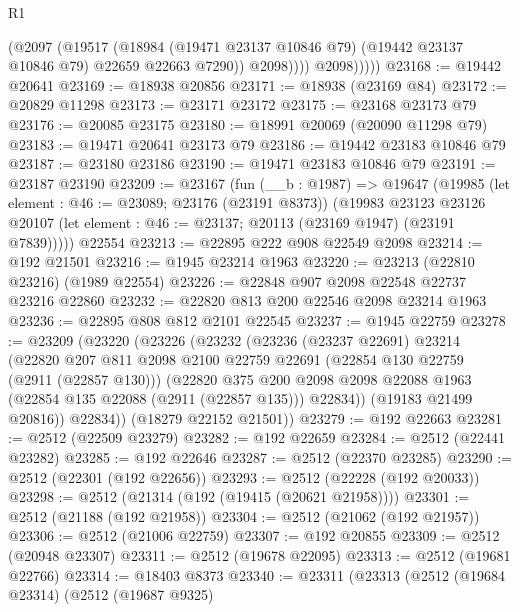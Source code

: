 \begin{lexlean}{R1}
\begin{coremodule}
                    (@2097
                      (@19517
                        (@18984
                          (@19471 @23137 @10846 @79)
                          (@19442 @23137 @10846 @79)
                          @22659
                          @22663
                          @7290))
                      @2098))))
              @2098)))))
@23168 := @19442 @20641
@23169 := @18938 @20856
@23171 := @18938 (@23169 @84)
@23172 := @20829 @11298
@23173 := @23171 @23172
@23175 := @23168 @23173 @79
@23176 := @20085 @23175
@23180 := @18991 @20069 (@20090 @11298 @79)
@23183 := @19471 @20641 @23173 @79
@23186 := @19442 @23183 @10846 @79
@23187 := @23180 @23186
@23190 := @19471 @23183 @10846 @79
@23191 := @23187 @23190
@23209 := @23167
    (fun (__b : @1987) =>
    @19647
      (@19985
        (let element : @46 := @23089; @23176 (@23191 @8373))
        (@19983
          @23123
          @23126
          @20107
          (let element : @46 := @23137; @20113 (@23169 @1947) (@23191 @7839)))))
    @22554
@23213 := @22895 @222 @908 @22549 @2098
@23214 := @192 @21501
@23216 := @1945 @23214 @1963
@23220 := @23213 (@22810 @23216) (@1989 @22554)
@23226 := @22848 @907 @2098 @22548 @22737 @23216 @22860
@23232 := @22820 @813 @200 @22546 @2098 @23214 @1963
@23236 := @22895 @808 @812 @2101 @22545
@23237 := @1945 @22759
@23278 := @23209
    (@23220
      (@23226
        (@23232
          (@23236
            (@23237 @22691)
            @23214
            (@22820
              @207
              @811
              @2098
              @2100
              @22759
              @22691
              (@22854 @130 @22759 (@2911 (@22857 @130)))
              (@22820
                @375
                @200
                @2098
                @2098
                @22088
                @1963
                (@22854 @135 @22088 (@2911 (@22857 @135)))
                @22834))
            (@19183 @21499 @20816))
          @22834))
      (@18279 @22152 @21501))
@23279 := @192 @22663
@23281 := @2512 (@22509 @23279)
@23282 := @192 @22659
@23284 := @2512 (@22441 @23282)
@23285 := @192 @22646
@23287 := @2512 (@22370 @23285)
@23290 := @2512 (@22301 (@192 @22656))
@23293 := @2512 (@22228 (@192 @20033))
@23298 := @2512 (@21314 (@192 (@19415 (@20621 @21958))))
@23301 := @2512 (@21188 (@192 @21958))
@23304 := @2512 (@21062 (@192 @21957))
@23306 := @2512 (@21006 @22759)
@23307 := @192 @20855
@23309 := @2512 (@20948 @23307)
@23311 := @2512 (@19678 @22095)
@23313 := @2512 (@19681 @22766)
@23314 := @18403 @8373
@23340 := @23311
    (@23313
      (@2512
        (@19684 @23314)
        (@2512
          (@19687 @9325)

\end{coremodule}
\end{lexlean}
